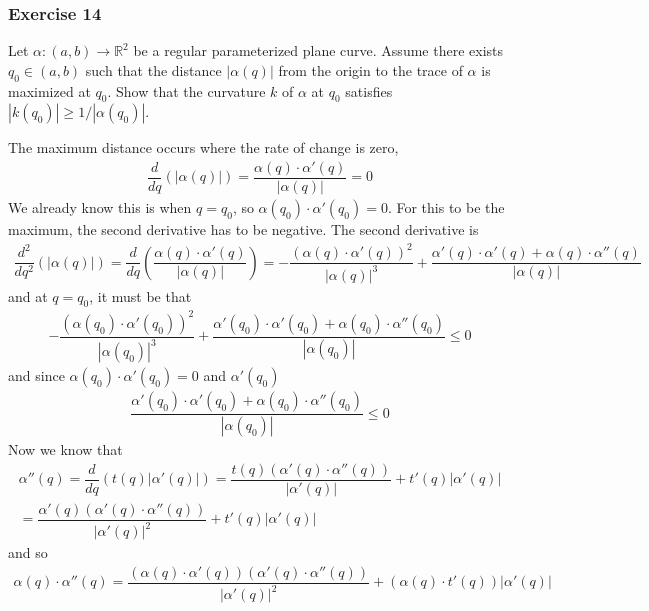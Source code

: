 \documentclass{article}
\newcommand{\R}{\mathbb{R}}
\begin{document}
	\subsubsection*{Exercise 14}
	Let $\alpha : (a, b) \to \R^2$ be a regular parameterized plane curve. Assume there exists $q_0 \in (a, b)$ such that the distance $|\alpha(q)|$ from the origin to the trace of $\alpha$ is maximized at $q_0$. Show that the curvature $k$ of $\alpha$ at $q_0$ satisfies $|k(q_0)| \geq 1/|\alpha(q_0)|$.
	
	The maximum distance occurs where the rate of change is zero, 
	\begin{gather*}
		\dfrac{d}{dq} (|\alpha(q)|) = \dfrac{\alpha(q) \cdot \alpha'(q)}{|\alpha(q)|} = 0
	\end{gather*}
	We already know this is when $q = q_0$, so $\alpha(q_0) \cdot \alpha'(q_0) = 0$. For this to be the maximum, the second derivative has to be negative. The second derivative is
	\begin{gather*}
		\dfrac{d^2}{dq^2} (|\alpha(q)|)  = \dfrac{d}{dq} \left( \dfrac{\alpha(q) \cdot \alpha'(q)}{|\alpha(q)|} \right) =
		-\dfrac{(\alpha(q) \cdot \alpha'(q))^2}{|\alpha(q)|^3} + \dfrac{\alpha'(q) \cdot \alpha'(q) + \alpha(q) \cdot \alpha''(q)}{|\alpha(q)|}
	\end{gather*}
	and at $q = q_0$, it must be that
	\begin{gather*}
		-\dfrac{(\alpha(q_0) \cdot \alpha'(q_0))^2}{|\alpha(q_0)|^3} + \dfrac{\alpha'(q_0) \cdot \alpha'(q_0) + \alpha(q_0) \cdot \alpha''(q_0)}{|\alpha(q_0)|} \leq 0
	\end{gather*}
	and since $\alpha(q_0) \cdot \alpha'(q_0) = 0$ and $\alpha'(q_0)$
	\begin{gather*}
		\dfrac{\alpha'(q_0) \cdot \alpha'(q_0) + \alpha(q_0) \cdot \alpha''(q_0)}{|\alpha(q_0)|} \leq 0
	\end{gather*}
	Now we know that
	\begin{gather*}
		\alpha''(q) = \dfrac{d}{dq} \left( t(q) |\alpha'(q)| \right) = \dfrac{t(q) \left(\alpha'(q) \cdot \alpha''(q) \right)}{|\alpha'(q)|} + t'(q) |\alpha'(q)| \\
		= \dfrac{\alpha'(q) \left(\alpha'(q) \cdot \alpha''(q) \right)}{|\alpha'(q)|^2} + t'(q) |\alpha'(q)| 
	\end{gather*}
	and so
	\begin{gather*}
		\alpha(q) \cdot \alpha''(q) = \dfrac{ \left( \alpha(q) \cdot \alpha'(q) \right) \left(\alpha'(q) \cdot \alpha''(q) \right)}{|\alpha'(q)|^2} + \left( \alpha(q) \cdot t'(q) \right) |\alpha'(q)| 
	\end{gather*}
\end{document}
